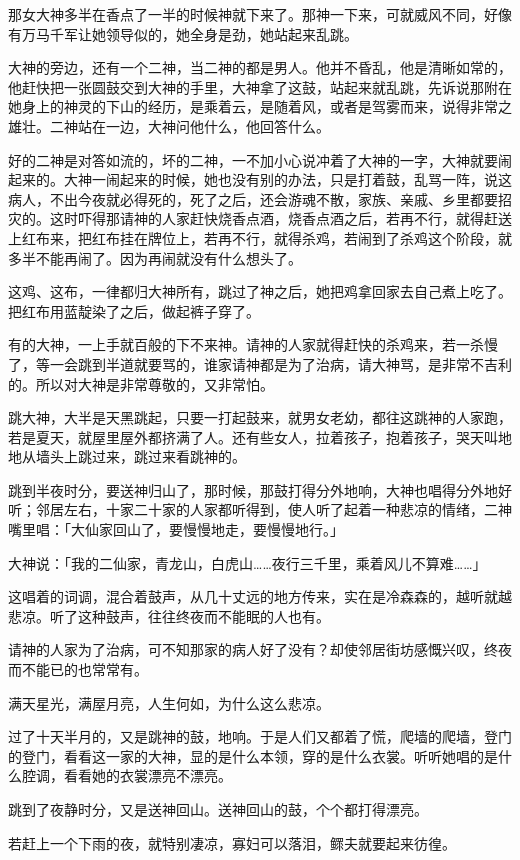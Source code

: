 \documentclass[UTF8]{ctexart}
\begin{document}
那女大神多半在香点了一半的时候神就下来了。那神一下来，可就威风不同，好像有万马千军让她领导似的，她全身是劲，她站起来乱跳。

大神的旁边，还有一个二神，当二神的都是男人。他并不昏乱，他是清晰如常的，他赶快把一张圆鼓交到大神的手里，大神拿了这鼓，站起来就乱跳，先诉说那附在她身上的神灵的下山的经历，是乘着云，是随着风，或者是驾雾而来，说得非常之雄壮。二神站在一边，大神问他什么，他回答什么。

好的二神是对答如流的，坏的二神，一不加小心说冲着了大神的一字，大神就要闹起来的。大神一闹起来的时候，她也没有别的办法，只是打着鼓，乱骂一阵，说这病人，不出今夜就必得死的，死了之后，还会游魂不散，家族、亲戚、乡里都要招灾的。这时吓得那请神的人家赶快烧香点酒，烧香点酒之后，若再不行，就得赶送上红布来，把红布挂在牌位上，若再不行，就得杀鸡，若闹到了杀鸡这个阶段，就多半不能再闹了。因为再闹就没有什么想头了。

这鸡、这布，一律都归大神所有，跳过了神之后，她把鸡拿回家去自己煮上吃了。把红布用蓝靛染了之后，做起裤子穿了。

有的大神，一上手就百般的下不来神。请神的人家就得赶快的杀鸡来，若一杀慢了，等一会跳到半道就要骂的，谁家请神都是为了治病，请大神骂，是非常不吉利的。所以对大神是非常尊敬的，又非常怕。

跳大神，大半是天黑跳起，只要一打起鼓来，就男女老幼，都往这跳神的人家跑，若是夏天，就屋里屋外都挤满了人。还有些女人，拉着孩子，抱着孩子，哭天叫地地从墙头上跳过来，跳过来看跳神的。

跳到半夜时分，要送神归山了，那时候，那鼓打得分外地响，大神也唱得分外地好听；邻居左右，十家二十家的人家都听得到，使人听了起着一种悲凉的情绪，二神嘴里唱：「大仙家回山了，要慢慢地走，要慢慢地行。」

大神说：「我的二仙家，青龙山，白虎山……夜行三千里，乘着风儿不算难……」

这唱着的词调，混合着鼓声，从几十丈远的地方传来，实在是冷森森的，越听就越悲凉。听了这种鼓声，往往终夜而不能眠的人也有。

请神的人家为了治病，可不知那家的病人好了没有？却使邻居街坊感慨兴叹，终夜而不能已的也常常有。

满天星光，满屋月亮，人生何如，为什么这么悲凉。

过了十天半月的，又是跳神的鼓，地响。于是人们又都着了慌，爬墙的爬墙，登门的登门，看看这一家的大神，显的是什么本领，穿的是什么衣裳。听听她唱的是什么腔调，看看她的衣裳漂亮不漂亮。

跳到了夜静时分，又是送神回山。送神回山的鼓，个个都打得漂亮。

若赶上一个下雨的夜，就特别凄凉，寡妇可以落泪，鳏夫就要起来彷徨。
\end{document}
